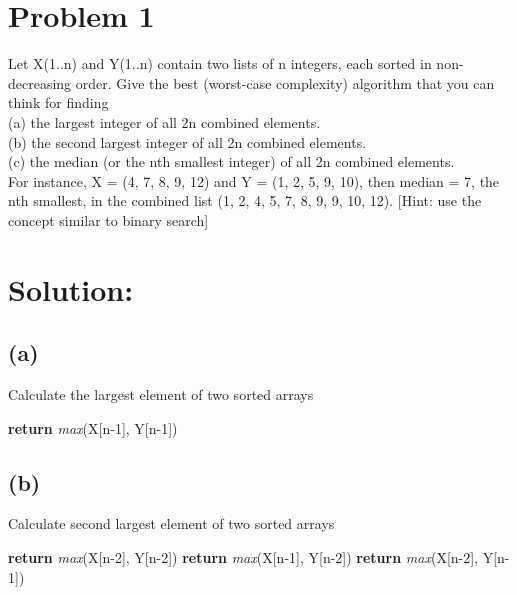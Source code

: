	\newdimen\boxitspace\boxitspace=3pt%
	\long\def\boxit#1{\vbox{\hrule\hbox{\vrule\kern\boxitspace\vbox{%
					\kern\boxitspace\parindent0pt#1\kern\boxitspace}%
				\kern\boxitspace\vrule}\hrule}}
	\def\aryitem#1{\boxit{\hbox to 1.4em{\hfil#1\hfil}}}%
	\let\MS\multispan%

    \section*{Problem 1}
    
    Let X(1..n) and Y(1..n) contain two lists of n integers, each sorted in non-decreasing order. Give the best (worst-case complexity) algorithm that you can think for finding \\
    (a) the largest integer of all 2n combined elements.\\
    (b) the second largest integer of all 2n combined elements.\\
    (c) the median (or the nth smallest integer) of all 2n combined elements.\\
    For instance, X = (4, 7, 8, 9, 12) and Y = (1, 2, 5, 9, 10), then median = 7, the nth smallest, in the combined list (1, 2, 4, 5, 7, 8, 9, 9, 10, 12). [Hint: use the concept similar to binary search]

    \section*{Solution:}
    	\subsection*{(a)}
  				\begin{algorithm}[H]
  					\caption{Calculate the largest element of two sorted arrays}
  					\begin{algorithmic}[1]
  						\State \textbf{return} \textit{max}(X[n-1], Y[n-1])
  						\EndProcedure
  					\end{algorithmic}
  				\end{algorithm}
  		\subsection*{(b)}
  			\begin{algorithm}[H]
  				\caption{Calculate second largest element of two sorted arrays}
  				\begin{algorithmic}[1]
  					\State\textbf{return} \textit{max}(X[n-2], Y[n-2])
  					\State\textbf{return} \textit{max}(X[n-1], Y[n-2])
  					\Else
  					\State\textbf{return} \textit{max}(X[n-2], Y[n-1])
  					\EndIf
  					\EndProcedure
  				\end{algorithmic}
  			\end{algorithm}	
